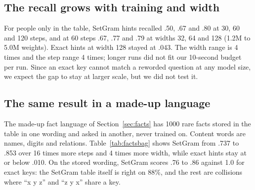 \documentclass[11pt]{article}
\begin{document}
\begin{table}[h]\centering\small
{}
\caption{Facts of trained people in the data three times. Width 32, 120 steps, one run each.}\label{tab:bio3}
\end{table}

\subsection{The recall grows with training and width}
For people only in the table, SetGram hints recalled .50, .67 and .80 at 30, 60 and 120 steps, and at 60 steps .67, .77 and .79 at widths 32, 64 and 128 (1.2M to 5.0M weights). Exact hints at width 128 stayed at .043. The width range is 4 times and the step range 4 times; longer runs did not fit our 10-second budget per run. Since an exact key cannot match a reworded question at any model size, we expect the gap to stay at larger scale, but we did not test it.

\subsection{The same result in a made-up language}
The made-up fact language of Section~\ref{sec:facts} has 1000 rare facts stored in the table in one wording and asked in another, never trained on. Content words are names, digits and relations. Table~\ref{tab:factsbag} shows SetGram from .737 to .853 over 16 times more steps and 4 times more width, while exact hints stay at or below .010. On the stored wording, SetGram scores .76 to .86 against 1.0 for exact keys: the SetGram table itself is right on 88\%, and the rest are collisions where ``x y z'' and ``z y x'' share a key.
\end{document}
